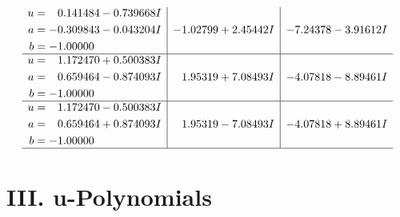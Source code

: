 \documentclass[1p]{elsarticle_modified}
\theoremstyle{definition}
\begin{document}
$$\begin{array}{c|c|c}
\begin{aligned}
u &= \phantom{-}0.141484 - 0.739668 I \\
a &= -0.309843 - 0.043204 I \\
b &= -1.00000\phantom{ +0.000000I}\end{aligned}
 & -1.02799 + 2.45442 I & -7.24378 - 3.91612 I \\ \hline\begin{aligned}
u &= \phantom{-}1.172470 + 0.500383 I \\
a &= \phantom{-}0.659464 - 0.874093 I \\
b &= -1.00000\phantom{ +0.000000I}\end{aligned}
 & \phantom{-}1.95319 + 7.08493 I & -4.07818 - 8.89461 I \\ \hline\begin{aligned}
u &= \phantom{-}1.172470 - 0.500383 I \\
a &= \phantom{-}0.659464 + 0.874093 I \\
b &= -1.00000\phantom{ +0.000000I}\end{aligned}
 & \phantom{-}1.95319 - 7.08493 I & -4.07818 + 8.89461 I\\
 \hline 
 \end{array}$$\newpage
\newpage\renewcommand{\arraystretch}{1}
\centering \section*{ III. u-Polynomials}
\end{document}
